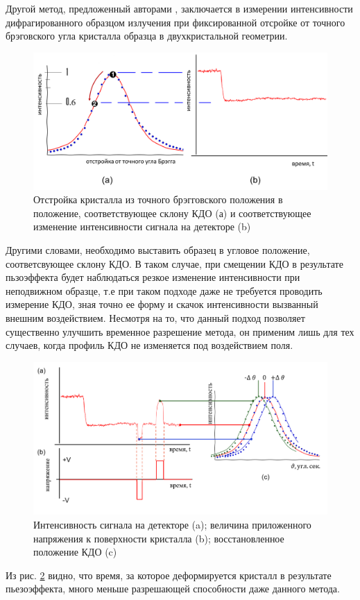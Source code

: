 \label{sec:slope_diff_piezo}
Другой метод, предложенный авторами \cite{piezo50}, заключается в измерении интенсивности
дифрагированного образцом излучения при фиксированной отсройке от точного
брэговского угла кристалла образца в двухкристальной геометрии.

\begin{figure}[H]
\centering
\includegraphics[width=1\linewidth]{images/kdopiez2.png}
\caption{Отстройка кристалла из точного брэгговского положения в положение,
соответствующее склону КДО (а) и соответствующее изменение интенсивности сигнала на детекторе (b)}
\label{ris:kdopiez}
\end{figure}
\noindent
Другими словами, необходимо выставить образец в угловое положение, соответсвующее склону КДО.
В таком случае, при смещении КДО в результате пьзоэффекта будет наблюдаться резкое изменение
интенсивности при неподвижном образце, т.е при таком подходе даже не требуется проводить
измерение КДО, зная точно ее форму и скачок интенсивности вызванный внешним воздействием.
Несмотря на то, что данный подход позволяет существенно улучшить временное разрешение метода,
он применим лишь для тех случаев, когда профиль КДО не изменяется под воздействием поля.

\begin{figure}[H]
\centering
\includegraphics[width=0.8\linewidth]{images/princip2.png}
\caption{Интенсивность сигнала на детекторе (a); величина  приложенного напряжения к
поверхности кристалла (b); восстановленное положение КДО (c)}
\label{ris:princip}
\end{figure}

Из рис. \ref{ris:princip}  видно, что время, за которое деформируется кристалл
в результате пьезоэффекта, много меньше разрешающей способности даже данного метода.
